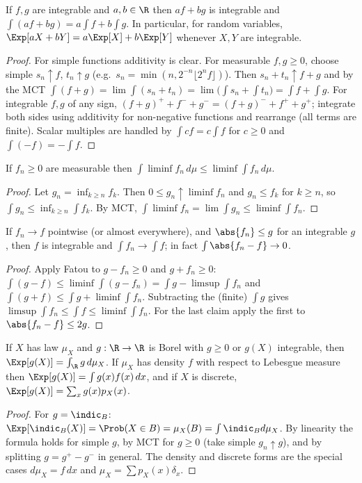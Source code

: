 \begin{theorem}[Linearity]\label{thm:linearity}
If $f,g$ are integrable and $a,b\in\R$ then $af+bg$ is integrable and
$\int(af+bg)=a\int f+b\int g$. In particular, for random variables,
$\Exp[aX+bY]=a\Exp[X]+b\Exp[Y]$ whenever $X,Y$ are integrable.
\end{theorem}
\begin{proof}
For simple functions additivity is clear. For measurable $f,g\ge0$, choose simple
$s_n\uparrow f$, $t_n\uparrow g$ (e.g.\ $s_n=\min(n,2^{-n}\lfloor2^nf\rfloor)$). Then
$s_n+t_n\uparrow f+g$ and by the MCT
$\int(f+g)=\lim\int(s_n+t_n)=\lim\bigl(\int s_n+\int t_n\bigr)=\int f+\int g$. For
integrable $f,g$ of any sign, $(f+g)^++f^-+g^-=(f+g)^-+f^++g^+$; integrate both sides
using additivity for non-negative functions and rearrange (all terms are finite). Scalar
multiples are handled by $\int cf=c\int f$ for $c\ge0$ and $\int(-f)=-\int f$.
\end{proof}

\begin{theorem}\label{thm:fatou}
If $f_n\ge0$ are measurable then $\int\liminf f_n\,d\mu\le\liminf\int f_n\,d\mu$.
\end{theorem}
\begin{proof}
Let $g_n=\inf_{k\ge n}f_k$. Then $0\le g_n\uparrow\liminf f_n$ and $g_n\le f_k$ for $k\ge n$,
so $\int g_n\le\inf_{k\ge n}\int f_k$. By MCT, $\int\liminf f_n=\lim\int g_n\le\liminf\int f_n$.
\end{proof}

\begin{theorem}\label{thm:dct}
If $f_n\to f$ pointwise (or almost everywhere), and $\abs{f_n}\le g$ for an integrable $g$,
then $f$ is integrable and $\int f_n\to\int f$; in fact $\int\abs{f_n-f}\to0$.
\end{theorem}
\begin{proof}
Apply Fatou to $g-f_n\ge0$ and $g+f_n\ge0$:
$\int(g-f)\le\liminf\int(g-f_n)=\int g-\limsup\int f_n$ and
$\int(g+f)\le\int g+\liminf\int f_n$. Subtracting the (finite) $\int g$ gives
$\limsup\int f_n\le\int f\le\liminf\int f_n$. For the last claim apply the first to
$\abs{f_n-f}\le2g$.
\end{proof}

\begin{theorem}\label{thm:lotusgen}
If $X$ has law $\mu_X$ and $g:\R\to\R$ is Borel with $g\ge0$ or $g(X)$ integrable, then
$\Exp[g(X)]=\int_\R g\,d\mu_X$. If $\mu_X$ has density $f$ with respect to Lebesgue measure
then $\Exp[g(X)]=\int g(x)f(x)\,dx$, and if $X$ is discrete, $\Exp[g(X)]=\sum_xg(x)p_X(x)$.
\end{theorem}
\begin{proof}
For $g=\indic_B$: $\Exp[\indic_B(X)]=\Prob(X\in B)=\mu_X(B)=\int\indic_Bd\mu_X$. By linearity
the formula holds for simple $g$, by MCT for $g\ge0$ (take simple $g_n\uparrow g$), and by
splitting $g=g^+-g^-$ in general. The density and discrete forms are the special cases
$d\mu_X=f\,dx$ and $\mu_X=\sum p_X(x)\delta_x$.
\end{proof}

